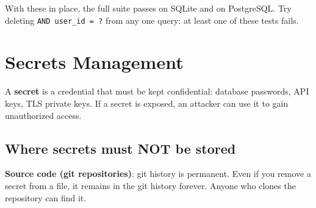\begin{codebox}
\begin{Shaded}
\begin{Highlighting}[]
\SpecialCharTok{\{}\NormalTok{alices\_note[}\NormalTok{]}\SpecialCharTok{\}}\OperatorTok{=}\NormalTok{\{}\NormalTok{: }\NormalTok{\})}
\SpecialCharTok{\{}\NormalTok{alices\_note[}\NormalTok{]}\SpecialCharTok{\}}\NormalTok{)}
\OperatorTok{=}\SpecialCharTok{\{}\NormalTok{alices\_note[}\NormalTok{]}\SpecialCharTok{\}}\NormalTok{)}
    \OperatorTok{==} 
    \NormalTok{ response.get\_json()[}\NormalTok{] }\OperatorTok{==} 
\end{Highlighting}
\end{Shaded}

\end{codebox}

\noindent{}With these in place, the full suite passes on SQLite and on PostgreSQL. Try deleting \texttt{AND\ user\_id\ =\ ?} from any one query: at least one of these tests fails.

\setcounter{section}{4}
\section{Secrets Management}\label{38-security:385-secrets-management}

A \textbf{secret} is a credential that must be kept confidential: database passwords, API keys, TLS private keys. If a secret is exposed, an attacker can use it to gain unauthorized access.

\subsection*{Where secrets must NOT be stored}\label{38-security:where-secrets-must-not-be-stored}

\textbf{Source code (git repositories)}: git history is permanent. Even if you remove a secret from a file, it remains in the git history forever. Anyone who clones the repository can find it.

